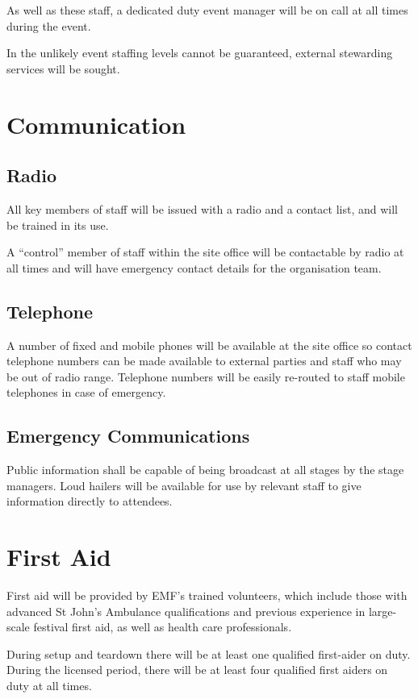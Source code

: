 As well as these staff, a dedicated duty event manager will be on call at all times during the event.

In the unlikely event staffing levels cannot be guaranteed, external stewarding services will be sought.

\section{Communication}

\subsection{Radio}
All key members of staff will be issued with a radio and a contact list, and will be trained in its use.

A ``control'' member of staff within the site office will be contactable by radio at all times and will
have emergency contact details for the organisation team.

\subsection{Telephone}
A number of fixed and mobile phones will be available at the site office so contact telephone numbers
can be made available to external parties and staff who may be out of radio range. Telephone numbers
will be easily re-routed to staff mobile telephones in case of emergency.

\subsection{Emergency Communications}
Public information shall be capable of being broadcast at all stages by the stage managers. Loud hailers will
be available for use by relevant staff to give information directly to attendees.

\section{First Aid}

First aid will be provided by EMF's trained volunteers, which include those with advanced St John's Ambulance
qualifications and previous experience in large-scale festival first aid, as well as health care professionals.

During setup and teardown there will be at least one qualified first-aider on duty. During the licensed period,
there will be at least four qualified first aiders on duty at all times.

